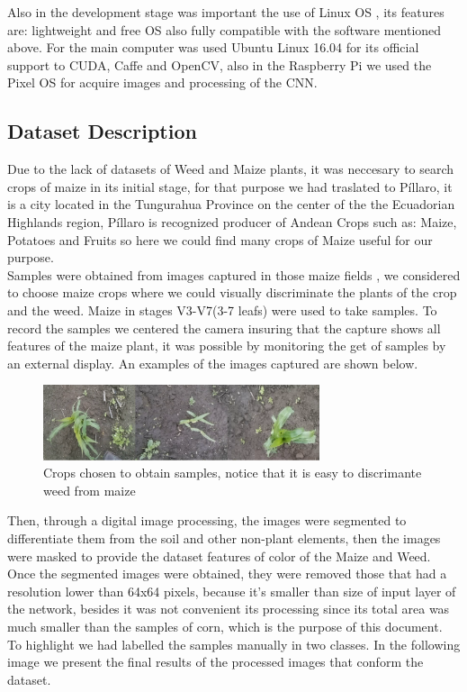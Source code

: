 \documentclass[conference]{IEEEtran}
\begin{document}
Also in the development stage was important the use of Linux OS , its features are: lightweight and free OS also fully compatible with the software mentioned above. For the main computer was used Ubuntu Linux 16.04 for its official support to CUDA, Caffe and OpenCV, also in the Raspberry Pi we used the Pixel OS for acquire images and processing of the CNN.
\\

\subsection{Dataset Description}
Due to the lack of datasets of Weed and Maize plants, it was neccesary to search crops of maize in its initial stage, for that purpose we had traslated to P\'illaro, it is a city located in the Tungurahua Province on the center of the  the Ecuadorian Highlands region, P\'illaro is recognized producer of Andean Crops such as: Maize, Potatoes and Fruits so here we could find many crops of Maize useful for our purpose. \\

Samples were obtained from images captured in those maize fields , we considered to choose maize crops where we could visually discriminate the plants of the crop and the weed. Maize in stages V3-V7(3-7 leafs) \cite{Fassio} were used to take samples. To record the samples we centered the camera insuring that the capture shows all features of the maize plant, it was possible by monitoring the get of samples by an external display. An examples of the images captured are shown below. 
\\

	\begin{figure}[h]
	\centering
	\includegraphics[width=3.2in]{entradamaiz}
	\caption{Crops chosen to obtain samples, notice that it is easy to discrimante weed from maize}
	\label{fig_sim}
	\end{figure}
	
Then, through a digital image processing, the images were segmented to differentiate them from the soil and other non-plant elements, then the images were masked to provide the dataset features of color of the Maize and Weed. Once the segmented images were obtained, they were removed those that had a resolution lower than 64x64 pixels, because it's smaller than size of input layer of the network, besides it was not convenient its processing since its total area was much smaller than the samples of corn, which is the purpose of this document. To highlight we had labelled the samples manually in two classes. In the following image we present the final results of the processed images that conform the dataset.
	
\end{document}
